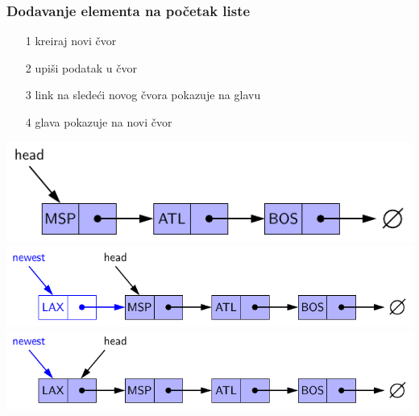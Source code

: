 \documentclass[compress,aspectratio=169]{beamer}
\begin{document}
\begin{frame}[fragile]
  \frametitle{Dodavanje elementa na početak liste}
  \begin{itemize}
    \item[1] kreiraj novi čvor
    \item[2] upiši podatak u čvor
    \item[3] link na sledeći novog čvora pokazuje na glavu
    \item[4] glava pokazuje na novi čvor
  \end{itemize}
  \begin{center}
    \includegraphics[scale=0.7]{asp-07-pic03a.pdf} \\
    \includegraphics[scale=0.7]{asp-07-pic03b.pdf} \\
    \includegraphics[scale=0.7]{asp-07-pic03c.pdf}
  \end{center}
\end{frame}
\end{document}
